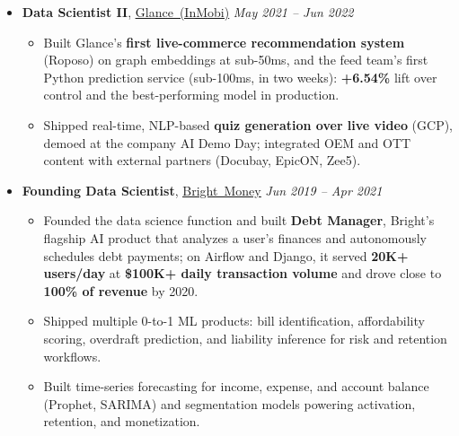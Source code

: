 \documentclass[letterpaper, 11pt]{article}
\let\oldhref\href
\renewcommand{\href}[2]{\oldhref{#1}{\uline{#2}}}
\newcommand{\resumeEntry}[3]{\item{\textbf{#1}, #2 \textbar{} \textit{#3}}}
\begin{document}
\begin{itemize}[leftmargin=0pt, label={}]
  \resumeEntry{Data Scientist II}{\href{https://glance.com/}{\mbox{Glance (InMobi)}}}{May 2021 -- Jun 2022}
  \begin{itemize}
    \item{Built Glance's \textbf{first live-commerce recommendation system} (Roposo) on graph embeddings at sub-50ms, and the feed team's first Python prediction service (sub-100ms, in two weeks): \textbf{+6.54\%} lift over control and the best-performing model in production.}
    \item{Shipped real-time, NLP-based \textbf{quiz generation over live video} (GCP), demoed at the company AI Demo Day; integrated OEM and OTT content with external partners (Docubay, EpicON, Zee5).}
  \end{itemize}

  \resumeEntry{Founding Data Scientist}{\href{https://www.brightmoney.co/}{\mbox{Bright Money}}}{Jun 2019 -- Apr 2021}
  \begin{itemize}
    \item{Founded the data science function and built \textbf{Debt Manager}, Bright's flagship AI product that analyzes a user's finances and autonomously schedules debt payments; on Airflow and Django, it served \textbf{20K+ users/day} at \textbf{\$100K+ daily transaction volume} and drove close to \textbf{100\% of revenue} by 2020.}
    \item{Shipped multiple 0-to-1 ML products: bill identification, affordability scoring, overdraft prediction, and liability inference for risk and retention workflows.}
    \item{Built time-series forecasting for income, expense, and account balance (Prophet, SARIMA) and segmentation models powering activation, retention, and monetization.}
  \end{itemize}
\end{itemize}

\pagebreak
\end{document}
